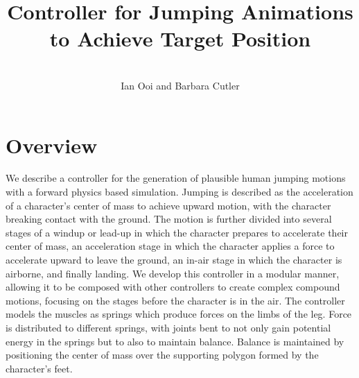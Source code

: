 \documentclass[landscape,26pt]{sciposter}
\title{Controller for Jumping Animations to Achieve Target Position}
\author{\ \\ Ian Ooi and Barbara Cutler}
\institute{Department of Computer Science\\
           Rensselaer Polytechnic Institute\\}
\begin{document}


\maketitle

\begin{minipage}[t]{10.5in}
	\section*{Overview}
		We describe a controller for the generation of plausible human jumping motions with a forward physics based simulation.  Jumping is described as the acceleration of a character's center of mass to achieve upward motion, with the character breaking contact with the ground.  The motion is further divided into several stages of a windup or lead-up in which the character prepares to accelerate their center of mass, an acceleration stage in which the character applies a force to accelerate upward to leave the ground, an in-air stage in which the character is airborne, and finally landing.  We develop this controller in a modular manner, allowing it to be composed with other controllers to create complex compound motions, focusing on the stages before the character is in the air.  The controller models the muscles as springs which produce forces on the limbs of the leg.  Force is distributed to different springs, with joints bent to not only gain potential energy in the springs but to also to maintain balance.  Balance is maintained by positioning the center of mass over the supporting polygon formed by the character's feet.

		\vspace{.3in}


\end{minipage}
\end{document}
